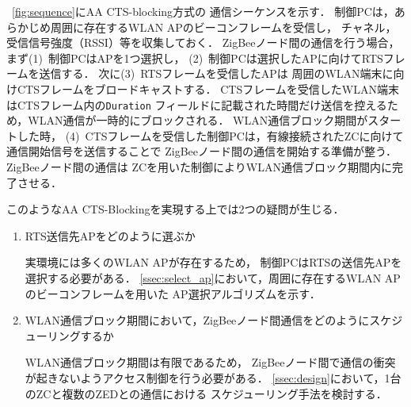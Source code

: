 \documentclass[12pt]{jreport}
\begin{document}
\figurename~\ref{fig:sequence}にAA CTS-blocking方式の
通信シーケンスを示す．
制御PCは，あらかじめ周囲に存在するWLAN APのビーコンフレームを受信し，
チャネル，受信信号強度（RSSI）等を収集しておく．
ZigBeeノード間の通信を行う場合，まず(1)~制御PCはAPを1つ選択し，
(2)~制御PCは選択したAPに向けてRTSフレームを送信する．
次に(3)~RTSフレームを受信したAPは
周囲のWLAN端末に向けCTSフレームをブロードキャストする．
CTSフレームを受信したWLAN端末はCTSフレーム内の\texttt{Duration}
フィールドに記載された時間だけ送信を控えるため，WLAN通信が一時的にブロックされる．
WLAN通信ブロック期間がスタートした時，
(4)~CTSフレームを受信した制御PCは，有線接続されたZCに向けて通信開始信号を送信することで
ZigBeeノード間の通信を開始する準備が整う．
ZigBeeノード間の通信は
ZCを用いた制御によりWLAN通信ブロック期間内に完了させる．

このようなAA CTS-Blockingを実現する上では2つの疑問が生じる．
\begin{enumerate}
 \item RTS送信先APをどのように選ぶか
 
	実環境には多くのWLAN APが存在するため，
	制御PCはRTSの送信先APを選択する必要がある．
	\ref{ssec:select_ap}において，周囲に存在するWLAN APのビーコンフレームを用いた
	AP選択アルゴリズムを示す．

 \item WLAN通信ブロック期間において，ZigBeeノード間通信をどのようにスケジューリングするか
 
 	WLAN通信ブロック期間は有限であるため，
	ZigBeeノード間で通信の衝突が起きないようアクセス制御を行う必要がある．
	\ref{ssec:design}において，1台のZCと複数のZEDとの通信における
	スケジューリング手法を検討する．

\end{enumerate}
\end{document}
